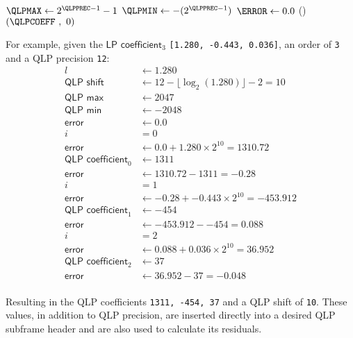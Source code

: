 \BlankLine
{}
$\QLPMAX \leftarrow 2 ^ {\text{\QLPPREC} - 1} - 1$\;
$\QLPMIN \leftarrow -(2 ^ {\text{\QLPPREC} - 1})$\;
$\ERROR \leftarrow 0.0$\;
(){
  \Return $(\QLPCOEFF~,~0)$\;
}
\EALGORITHM

\clearpage

For example, given the $\textsf{LP coefficient}_3$ \texttt{[1.280, -0.443, 0.036]},
an \textsf{order} of \texttt{3} and a \textsf{QLP precision} \texttt{12}:
\begin{align*}
l &\leftarrow 1.280 \\
\textsf{QLP shift} &\leftarrow 12 - \lfloor \log_2(1.280) \rfloor - 2 = 10 \\
\textsf{QLP max} &\leftarrow 2047 \\
\textsf{QLP min} &\leftarrow -2048 \\
\textsf{error} &\leftarrow 0.0 \\
i &= 0 \\
\textsf{error} &\leftarrow 0.0 + 1.280 \times 2 ^ {10} = 1310.72 \\
\textsf{QLP coefficient}_0 &\leftarrow 1311 \\
\textsf{error} &\leftarrow 1310.72 - 1311 = -0.28 \\
i &= 1 \\
\textsf{error} &\leftarrow -0.28 + -0.443 \times 2 ^ {10} = -453.912 \\
\textsf{QLP coefficient}_1 &\leftarrow -454 \\
\textsf{error} &\leftarrow -453.912 - -454 = 0.088 \\
i &= 2 \\
\textsf{error} &\leftarrow 0.088 + 0.036 \times 2 ^ {10} = 36.952 \\
\textsf{QLP coefficient}_2 &\leftarrow 37 \\
\textsf{error} &\leftarrow 36.952 - 37 = -0.048 \\
\end{align*}
\par
\noindent
Resulting in the QLP coefficients \texttt{1311, -454, 37}
and a QLP shift of \texttt{10}.
These values, in addition to QLP precision,
are inserted directly into a desired QLP subframe header
and are also used to calculate its residuals.


